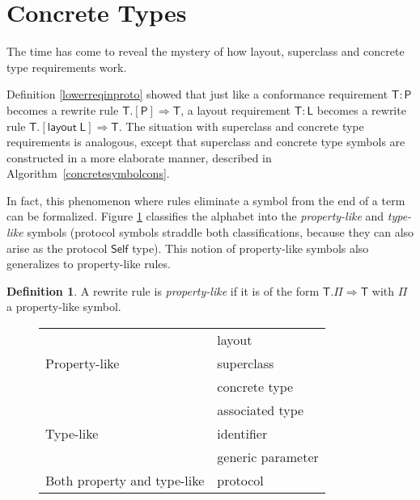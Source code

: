 \documentclass[a4paper,headsepline,bibliography=totoc,toc=flat,fleqn,twoside=semi]{scrbook}
\theoremstyle{definition}
\newtheorem{definition}{Definition}[chapter]
\theoremstyle{definition}
\theoremstyle{definition}
\newcommand{\namesym}[1]{\mathsf{#1}}
\newcommand{\proto}[1]{\bm{\mathsf{#1}}}
\newcommand{\protosym}[1]{[\proto{#1}]}
\newcommand{\layoutsym}[1]{[\mathsf{layout\;#1}]}
\begin{document}
\section{Concrete Types}\label{concretetypes}

The time has come to reveal the mystery of how layout, superclass and concrete type requirements work.

Definition \ref{lowerreqinproto} showed that just like a conformance requirement $\namesym{T}\colon\proto{P}$ becomes a rewrite rule $\namesym{T}.\protosym{P}\Rightarrow\namesym{T}$, a layout requirement $\namesym{T}\colon\namesym{L}$ becomes a rewrite rule $\namesym{T}.\layoutsym{L}\Rightarrow\namesym{T}$. The situation with superclass and concrete type requirements is analogous, except that superclass and concrete type symbols are constructed in a more elaborate manner, described in Algorithm~\ref{concretesymbolcons}.

In fact, this phenomenon where rules eliminate a symbol from the end of a term can be formalized. Figure \ref{symbolclass} classifies the alphabet into the \emph{property-like} and \emph{type-like} symbols (protocol symbols straddle both classifications, because they can also arise as the protocol $\proto{Self}$ type). This notion of property-like symbols also generalizes to property-like rules.
\begin{definition} A rewrite rule is \emph{property-like} if it is of the form $\namesym{T}.\namesym{\Pi}\Rightarrow\namesym{T}$ with $\namesym{\Pi}$ a property-like symbol.
\end{definition}

\begin{figure}\label{symbolclass}
\begin{center}
\begin{tabular}{|l|l|}
\hline
\multirow{3}{14em}{Property-like}& layout\\
&superclass\\
&concrete type\\
\hline
\multirow{3}{14em}{Type-like}& associated type\\
&identifier\\
&generic parameter\\
\hline
\multirow{1}{14em}{Both property and type-like}& protocol\\
\hline
\end{tabular}
\end{center}
\end{figure}
\end{document}
